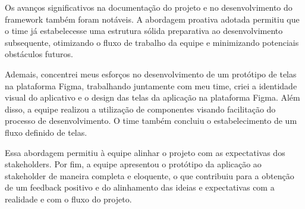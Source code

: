 Os avanços significativos na documentação do projeto e no desenvolvimento do framework também foram notáveis. A abordagem proativa adotada permitiu que o time já estabelecesse uma estrutura sólida preparativa ao desenvolvimento subsequente, otimizando o fluxo de trabalho da equipe e minimizando potenciais obstáculos futuros. 

Ademais, concentrei meus esforços no desenvolvimento de um protótipo de telas na plataforma Figma, trabalhando juntamente com meu time, criei a identidade visual do aplicativo e o design das telas da aplicação na plataforma Figma. Além disso, a equipe realizou a utilização de componentes visando facilitação do processo de desenvolvimento. O time também  concluiu o estabelecimento de um fluxo definido de telas.

Essa abordagem permitiu à equipe alinhar o projeto com as expectativas dos stakeholders. Por fim, a equipe apresentou o protótipo da aplicação ao stakeholder de maneira completa e eloquente, o que contribuiu para a obtenção de um feedback positivo e do alinhamento das ideias e expectativas com a realidade e com o fluxo do projeto.